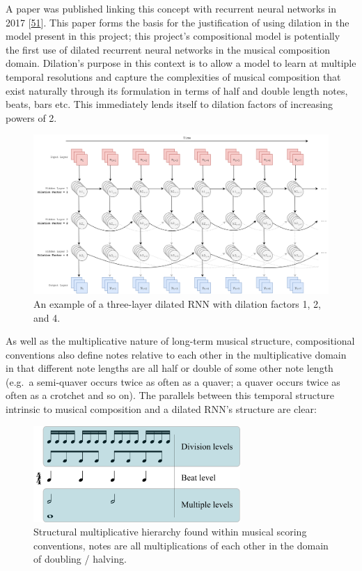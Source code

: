 \documentclass[12pt,]{article}
\begin{document}
A paper was published linking this concept with recurrent neural
networks in 2017 {[}\protect\hyperlink{ref-chang2017dilated}{51}{]}.
This paper forms the basis for the justification of using dilation in
the model present in this project; this project's compositional model is
potentially the first use of dilated recurrent neural networks in the
musical composition domain. Dilation's purpose in this context is to
allow a model to learn at multiple temporal resolutions and capture the
complexities of musical composition that exist naturally through its
formulation in terms of half and double length notes, beats, bars etc.
This immediately lends itself to dilation factors of increasing powers
of 2.

\begin{figure}
\centering
\includegraphics[width=1\textwidth,height=\textheight]{Images/dilatedrnn.png}
\caption{An example of a three-layer dilated RNN with dilation factors
1, 2, and 4.}
\end{figure}

As well as the multiplicative nature of long-term musical structure,
compositional conventions also define notes relative to each other in
the multiplicative domain in that different note lengths are all half or
double of some other note length (e.g.~a semi-quaver occurs twice as
often as a quaver; a quaver occurs twice as often as a crotchet and so
on). The parallels between this temporal structure intrinsic to musical
composition and a dilated RNN's structure are clear:

\begin{figure}
\centering
\includegraphics[width=0.7\textwidth,height=\textheight]{Images/Metric_levels.png}
\caption{Structural multiplicative hierarchy found within musical
scoring conventions, notes are all multiplications of each other in the
domain of doubling / halving.}
\end{figure}
\end{document}
